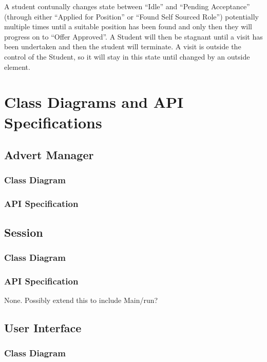 \documentclass[11pt]{article}
\begin{document}
A student contunally changes state between ``Idle'' and ``Pending
Acceptance'' (through either ``Applied for Position'' or ``Found Self
Sourced Role'') potentially multiple times until a suitable position
has been found and only then they will progress on to ``Offer
Approved''. A Student will then be stagnant until a visit has been
undertaken and then the student will terminate. A visit is outside the
control of the Student, so it will stay in this state until changed by
an outside element.

\newpage

\section{Class Diagrams and API Specifications}

\subsection{Advert Manager}

\subsubsection{Class Diagram}

\subsubsection{API Specification}

\subsection{Session}

\subsubsection{Class Diagram}

\subsubsection{API Specification}

None. Possibly extend this to include Main/run?

\subsection{User Interface}

\subsubsection{Class Diagram}
\end{document}
